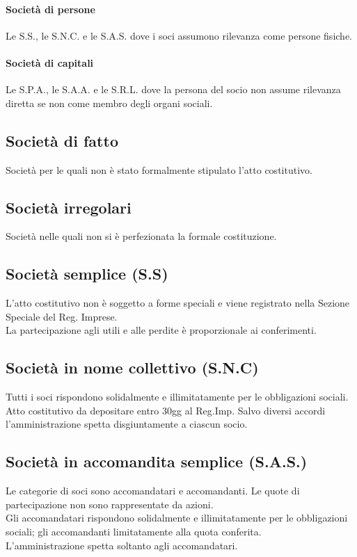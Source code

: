 \documentclass{report}
\begin{document}
	\paragraph{Società di persone}Le S.S., le S.N.C. e le S.A.S. dove i soci assumono rilevanza come persone fisiche.
	\paragraph{Società di capitali}Le S.P.A., le S.A.A. e le S.R.L. dove la persona del socio non assume rilevanza diretta se non come membro degli organi sociali.
	\subsection{Società di fatto}
	Società per le quali non è stato formalmente stipulato l'atto costitutivo.
	\subsection{Società irregolari}
	Società nelle quali non si è perfezionata la formale costituzione.
	\subsection{Società semplice (S.S)}
	L'atto costitutivo non è soggetto a forme speciali e viene registrato nella Sezione Speciale del Reg. Imprese.\medskip \\La partecipazione agli utili e alle perdite è proporzionale ai conferimenti.
	\subsection{Società in nome collettivo (S.N.C)}
	Tutti i soci rispondono solidalmente e illimitatamente per le obbligazioni sociali. Atto costitutivo da depositare entro 30gg al Reg.Imp. Salvo diversi accordi l'amministrazione spetta disgiuntamente a ciascun socio.
	\subsection{Società in accomandita semplice (S.A.S.)}
	Le categorie di soci sono accomandatari e accomandanti. Le quote di partecipazione non sono rappresentate da azioni.\medskip \\Gli accomandatari rispondono solidalmente e illimitatamente per le obbligazioni sociali; gli accomandanti limitatamente alla quota conferita.\medskip \\
	L'amministrazione spetta soltanto agli accomandatari.
\end{document}
